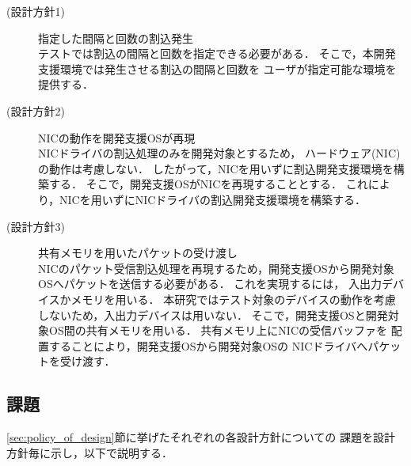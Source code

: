 \documentclass[submit,techreq,noauthor,dvipdfmx]{ipsj}
\begin{document}
\begin{description}
    \item[(設計方針1)] 指定した間隔と回数の割込発生\\
        テストでは割込の間隔と回数を指定できる必要がある．
        そこで，本開発支援環境では発生させる割込の間隔と回数を
        ユーザが指定可能な環境を提供する．
    \item[(設計方針2)] NICの動作を開発支援OSが再現\\
        NICドライバの割込処理のみを開発対象とするため，
        ハードウェア(NIC)の動作は考慮しない．
        したがって，NICを用いずに割込開発支援環境を構築する．
        そこで，開発支援OSがNICを再現することとする．
        これにより，NICを用いずにNICドライバの割込開発支援環境を構築する．
    \item[(設計方針3)] 共有メモリを用いたパケットの受け渡し\\
        NICのパケット受信割込処理を再現するため，開発支援OSから開発対象OSへパケットを送信する必要がある．
        これを実現するには，
        入出力デバイスかメモリを用いる．
        本研究ではテスト対象のデバイスの動作を考慮しないため，入出力デバイスは用いない．
        そこで，開発支援OSと開発対象OS間の共有メモリを用いる．
        共有メモリ上にNICの受信バッファを
        配置することにより，開発支援OSから開発対象OSの
        NICドライバへパケットを受け渡す．
\end{description}

\subsection{課題}\label{sec:challenge}

\ref{sec:policy_of_design}節に挙げたそれぞれの各設計方針についての
課題を設計方針毎に示し，以下で説明する．
\end{document}
